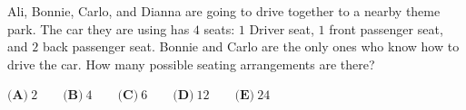 Ali, Bonnie, Carlo, and Dianna are going to drive together to a nearby theme park. The car they are using has $4$ seats: $1$ Driver seat, $1$ front passenger seat, and $2$ back passenger seat. Bonnie and Carlo are the only ones who know how to drive the car. How many possible seating arrangements are there?



$\textbf{(A)}\ 2 \qquad
\textbf{(B)}\ 4 \qquad
\textbf{(C)}\ 6 \qquad
\textbf{(D)}\ 12 \qquad
\textbf{(E)}\ 24$
